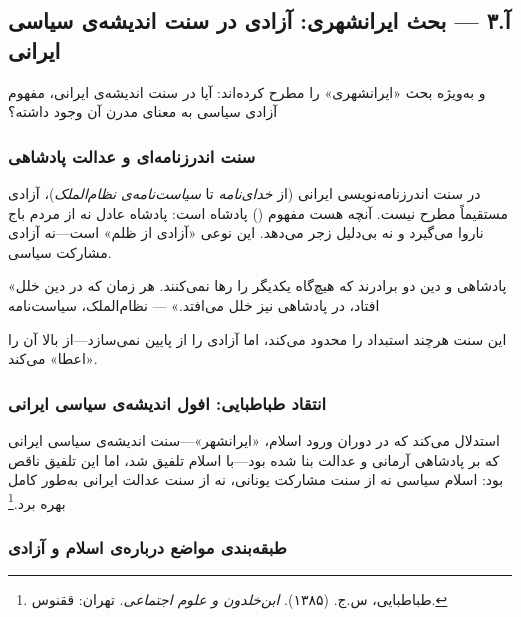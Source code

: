 \subsection{آ.۳ — بحث ایرانشهری: آزادی در سنت اندیشه‌ی سیاسی ایرانی}
\label{subsec:iranshahri}

 و به‌ویژه  بحث «ایرانشهری» را مطرح کرده‌اند: آیا در سنت اندیشه‌ی ایرانی، مفهوم آزادی سیاسی به معنای مدرن آن وجود داشته؟

\subsubsection{سنت اندرزنامه‌ای و عدالت پادشاهی}

در سنت اندرزنامه‌نویسی ایرانی (از \textit{خدای‌نامه} تا \textit{سیاست‌نامه‌ی نظام‌الملک})، آزادی مستقیماً مطرح نیست. آنچه هست مفهوم  () پادشاه است: پادشاه عادل نه از مردم باج ناروا می‌گیرد و نه بی‌دلیل زجر می‌دهد. این نوعی «آزادی از ظلم» است—نه آزادی مشارکت سیاسی.

\begin{tcolorbox}[quotebox]
«پادشاهی و دین دو برادرند که هیچ‌گاه یکدیگر را رها نمی‌کنند. هر زمان که در دین خلل افتاد، در پادشاهی نیز خلل می‌افتد.» — نظام‌الملک، سیاست‌نامه
\end{tcolorbox}

این سنت هرچند استبداد را محدود می‌کند، اما آزادی را از پایین نمی‌سازد—از بالا آن را «اعطا» می‌کند.

\subsubsection{انتقاد طباطبایی: افول اندیشه‌ی سیاسی ایرانی}

 استدلال می‌کند که در دوران ورود اسلام، «ایرانشهر»—سنت اندیشه‌ی سیاسی ایرانی که بر پادشاهی آرمانی و عدالت بنا شده بود—با اسلام تلفیق شد، اما این تلفیق ناقص بود: اسلام سیاسی نه از سنت مشارکت یونانی، نه از سنت عدالت ایرانی به‌طور کامل بهره برد.\footnote{طباطبایی، س.ج. (۱۳۸۵). \textit{ابن‌خلدون و علوم اجتماعی}. تهران: ققنوس.}

\subsubsection{طبقه‌بندی مواضع درباره‌ی اسلام و آزادی}

